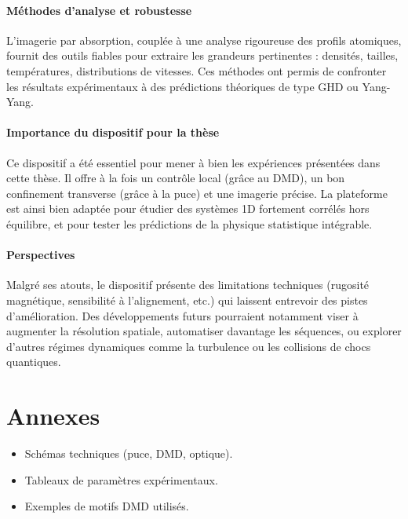 \paragraph{Méthodes d’analyse et robustesse}  
L’imagerie par absorption, couplée à une analyse rigoureuse des profils atomiques, fournit des outils fiables pour extraire les grandeurs pertinentes : densités, tailles, températures, distributions de vitesses. Ces méthodes ont permis de confronter les résultats expérimentaux à des prédictions théoriques de type GHD ou Yang-Yang.

\paragraph{Importance du dispositif pour la thèse}  
Ce dispositif a été essentiel pour mener à bien les expériences présentées dans cette thèse. Il offre à la fois un contrôle local (grâce au DMD), un bon confinement transverse (grâce à la puce) et une imagerie précise. La plateforme est ainsi bien adaptée pour étudier des systèmes 1D fortement corrélés hors équilibre, et pour tester les prédictions de la physique statistique intégrable.

\paragraph{Perspectives}  
Malgré ses atouts, le dispositif présente des limitations techniques (rugosité magnétique, sensibilité à l’alignement, etc.) qui laissent entrevoir des pistes d’amélioration. Des développements futurs pourraient notamment viser à augmenter la résolution spatiale, automatiser davantage les séquences, ou explorer d'autres régimes dynamiques comme la turbulence ou les collisions de chocs quantiques.



\section*{Annexes}
\begin{itemize}
    \item Schémas techniques (puce, DMD, optique).
    \item Tableaux de paramètres expérimentaux.
    \item Exemples de motifs DMD utilisés.
\end{itemize}